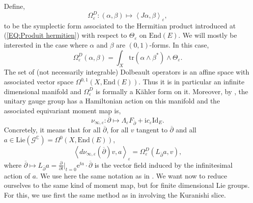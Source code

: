 \documentclass{article}
\theoremstyle{remark}
\theoremstyle{definition}
\newcommand{\C}{\mathbb{C}}
\newcommand{\End}{\mathrm{End}}
\newcommand{\tr}{\mathrm{tr}}
\newcommand{\Lie}{\mathrm{Lie}}
\newcommand{\Id}{\mathrm{Id}}
\renewcommand{\i}{\boldsymbol{\mathrm{i}}}
\newcommand{\e}{\boldsymbol{\mathrm{e}}}
\newcommand{\scal}[2]{\left< #1,#2 \right>}
\newcommand{\G}{\mathcal{G}}
\newcommand{\dbar}{\overline{\partial}}
\begin{document}
Define,
$$
\Omega_\varepsilon^D : (\alpha,\beta) \mapsto \scal{J\alpha}{\beta}_\varepsilon,
$$
to be the symplectic form associated to the Hermitian product introduced at (\ref{EQ:Produit hermitien}) with respect to $\Theta_\varepsilon$ on $\End(E)$. We will mostly be interested in the case where $\alpha$ and $\beta$ are $(0,1)$-forms. In this case,
$$
\Omega_\varepsilon^D(\alpha,\beta) = \int_X \tr(\alpha \wedge \beta^*) \wedge \Theta_\varepsilon.
$$
The set of (not necessarily integrable) Dolbeault operators is an affine space with associated vector space $\Omega^{0,1}(X,\End(E))$. Thus it is in particular an infinite dimensional manifold and $\Omega_\varepsilon^D$ is formally a Kähler form on it. Moreover, by \cite{Atiyah_Bott,Donaldson}, the unitary gauge group has a Hamiltonian action on this manifold and the associated equivariant moment map is,
$$
\nu_{\infty,\varepsilon} : \dbar \mapsto \Lambda_\varepsilon F_{\dbar} + \i c_\varepsilon\Id_E.
$$
Concretely, it means that for all $\dbar$, for all $v$ tangent to $\dbar$ and all $a \in \Lie(\G^\C) = \Omega^0(X,\End(E))$,
\begin{equation}\label{EQ:Application moment dimension infinie}
    \scal{d\nu_{\infty,\varepsilon}(\dbar)v}{a}_\varepsilon = \Omega_\varepsilon^D(L_{\dbar}a,v),
\end{equation}
where $\dbar \mapsto L_{\dbar}a = \frac{\partial}{\partial t}|_{t = 0}\e^{ta} \cdot \dbar$ is the vector field induced by the infinitesimal action of $a$. We use here the same notation as in \cite{GRS}. We want now to reduce ourselves to the same kind of moment map, but for finite dimensional Lie groups. For this, we use first the same method as in \cite{DMS,Clarke_Tipler,Gabor} involving the Kuranishi slice.
\end{document}
